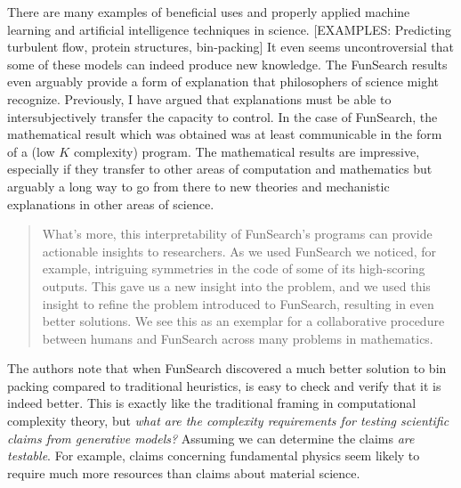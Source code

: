 \documentclass[11pt, oneside]{article}   	%
\begin{document}
There are many examples of beneficial uses and properly applied machine learning and artificial intelligence techniques in science.  [EXAMPLES: Predicting turbulent flow, protein structures, bin-packing]  It even seems uncontroversial that some of these models can indeed produce new knowledge.  \citep{FunSearch2024}  The FunSearch results even arguably provide a form of explanation that philosophers of science might recognize.  Previously, I have argued that explanations must be able to intersubjectively transfer the capacity to control.  In the case of FunSearch, the mathematical result which was obtained was at least communicable in the form of a (low $K$ complexity) program. The mathematical results are impressive, especially if they transfer to other areas of computation and mathematics but arguably a long way to go from there to new theories and mechanistic explanations in other areas of science.  


\begin{quote}
    What’s more, this interpretability of FunSearch’s programs can provide actionable insights to researchers. As we used FunSearch we noticed, for example, intriguing symmetries in the code of some of its high-scoring outputs. This gave us a new insight into the problem, and we used this insight to refine the problem introduced to FunSearch, resulting in even better solutions. We see this as an exemplar for a collaborative procedure between humans and FunSearch across many problems in mathematics.

    \citep{FunSearch2024}
\end{quote}


The authors note that when FunSearch discovered a much better solution to bin packing compared to traditional heuristics, is easy to check and verify that it is indeed better.  This is exactly like the traditional framing in computational complexity theory, but \emph{what are the complexity requirements for testing scientific claims from generative models?}  Assuming we can determine the claims \emph{are testable}.  For example, claims concerning fundamental physics seem likely to require much more resources than claims about material science.
\end{document}
